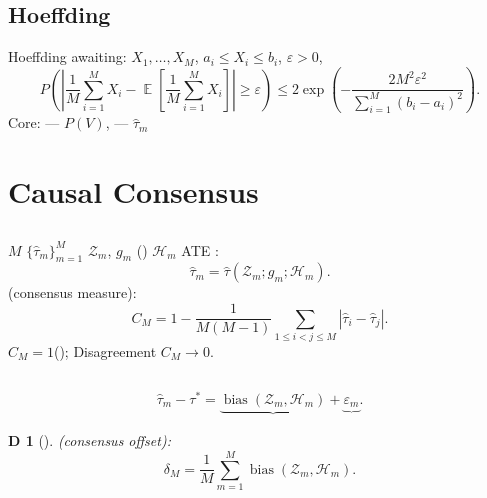 \documentclass[11pt,a4paper,twoside]{article}
\newtheorem{definition}[theorem]Definition
\DeclareMathOperator*{\E}{\mathbb{E}}
\DeclareMathOperator{\bias}{bias}
\begin{document}
\subsection{Hoeffding}
 Hoeffding awaiting: $X_1, \ldots, X_M$, 
$a_i \leq X_i \leq b_i$, $\varepsilon > 0$, 
\[
P\left(\left|\frac{1}{M}\sum_{i=1}^{M} X_i - \E\left[\frac{1}{M}\sum_{i=1}^{M} X_i\right]\right| \geq \varepsilon\right)
\leq 2\exp\left(-\frac{2M^2\varepsilon^2}{\sum_{i=1}^{M}(b_i - a_i)^2}\right).
\]
Core: ---
$P(V)$, --- $\hat{\tau}_m$ 
\section{Causal Consensus}
\subsection{}
 $M$ $\{\hat{\tau}_m\}_{m=1}^{M}$ $\mathcal{Z}_m$, 
 $g_m$ () $\mathcal{H}_m$ ATE : 
\[
\hat{\tau}_m = \hat{\tau}(\mathcal{Z}_m; g_m; \mathcal{H}_m).
\]
(consensus measure): 
\[
C_M = 1 - \frac{1}{M(M-1)}\sum_{1 \leq i < j \leq M} |\hat{\tau}_i - \hat{\tau}_j|.
\]
 $C_M = 1$(); Disagreement $C_M \to 0$.
\subsection{}
\[
\hat{\tau}_m - \tau^* = \underbrace{\bias(\mathcal{Z}_m, \mathcal{H}_m)}_{\text{}}
 + \underbrace{\varepsilon_m}_{\text{}}.
\]
\begin{definition}[]
(consensus offset): 
\[
\delta_M = \frac{1}{M}\sum_{m=1}^{M} \bias(\mathcal{Z}_m, \mathcal{H}_m).
\]
\end{definition}
\end{document}
